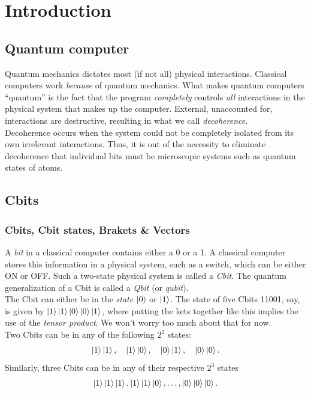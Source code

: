 \documentclass{book}
\theoremstyle{definition}
\begin{document}
\section{Introduction}

\subsection{Quantum computer}

Quantum mechanics dictates most (if not all) physical interactions. Classical computers work \textit{because} of quantum mechanics. What makes quantum computers ``quantum'' is the fact that the program \textit{completely} controls \textit{all} interactions in the physical system that makes up the computer. External, unaccounted for, interactions are destructive, resulting in what we call \textit{decoherence}. \\

Decoherence occurs when the system could not be completely isolated from its own irrelevant interactions. Thus, it is out of the necessity to eliminate decoherence that individual bits must be microscopic systems such as quantum states of atoms. 




\subsection{Cbits}

\subsubsection{Cbits, Cbit states, Brakets \& Vectors}

A \textit{bit} in a classical computer contains either a 0 or a 1. A classical computer stores this information in a physical system, such as a switch, which can be either ON or OFF. Such a two-state physical system is called a \textit{Cbit}. The quantum generalization of a Cbit is called a \textit{Qbit} (or \textit{qubit}). \\

The Cbit can either be in the \textit{state} $\ket{0}$ or $\ket{1}$. The state of five Cbits 11001, say, is given by $\ket{1}\ket{1}\ket{0}\ket{0}\ket{1}$, where putting the kets together like this implies the use of the \textit{tensor product}. We won't worry too much about that for now. \\

Two Cbits can be in any of the following $2^2$ states:
\begin{align}
\ket{1}\ket{1}, \quad \ket{1}\ket{0}, \quad \ket{0}\ket{1}, \quad \ket{0}\ket{0}.
\end{align}
Similarly, three Cbits can be in any of their respective $2^3$ states
\begin{align}
\ket{1}\ket{1}\ket{1}, \ket{1}\ket{1}\ket{0},\dots,\ket{0}\ket{0}\ket{0}.
\end{align}
\end{document}
